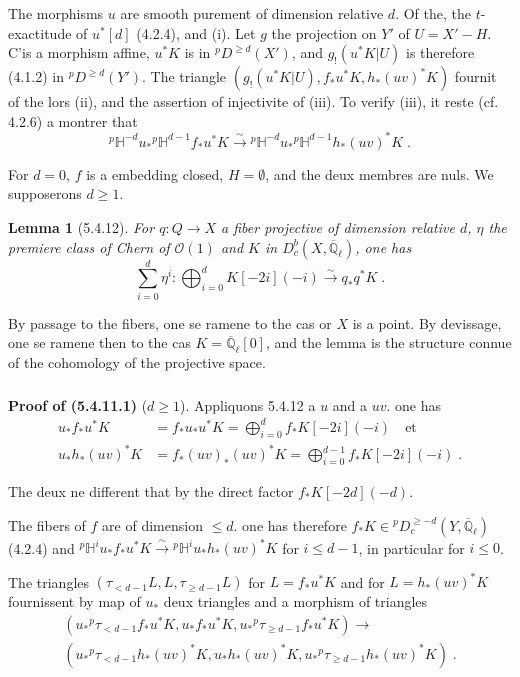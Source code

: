 \documentclass[12pt,a4paper]{article}
\theoremstyle{plain}
\newtheorem{lemma}[theorem]{Lemma}
\theoremstyle{definition}
\theoremstyle{remark}
\newcommand{\HH}{\mathbb{H}}
\newcommand{\QQ}{\mathbb{Q}}
\newcommand{\cO}{\mathcal{O}}
\begin{document}
The morphisms $u$ are smooth purement of dimension relative $d$. Of the, the $t$-exactitude of $u^*[d]$ (4.2.4), and (i). Let $g$ the projection on $Y'$ of $U = X' - H$. C'is a morphism affine, $u^*K$ is in ${}^{p}D^{\geq d}(X')$, and $g_!(u^*K|U)$ is therefore (4.1.2) in ${}^{p}D^{\geq d}(Y')$. The triangle $(g_!(u^*K|U), f_*u^*K, h_*(uv)^*K)$ fournit of the lors (ii), and the assertion of injectivite of (iii). To verify (iii), it reste (cf. 4.2.6) a montrer that
\begin{equation}\label{eq:5.4.11.1}
{}^{p}\HH^{-d}u_*{}^{p}\HH^{d-1}f_*u^*K \xrightarrow{\sim} {}^{p}\HH^{-d}u_*{}^{p}\HH^{d-1}h_*(uv)^*K\;.
\end{equation}

For $d = 0$, $f$ is a embedding closed, $H = \emptyset$, and the deux membres are nuls. We supposerons $d \geq 1$.

\begin{lemma}[5.4.12]
For $q: Q \to X$ a fiber projective of dimension relative $d$, $\eta$ the premiere class of Chern of $\cO(1)$ and $K$ in $D^b_c(X, \overline{\QQ}_{\ell})$, one has
\[
\sum_{i=0}^{d} \eta^i: \bigoplus_{i=0}^{d} K[-2i](-i) \xrightarrow{\sim} q_*q^*K\;.
\]
\end{lemma}

By passage to the fibers, one se ramene to the cas or $X$ is a point. By devissage, one se ramene then to the cas $K = \overline{\QQ}_{\ell}[0]$, and the lemma is the structure connue of the cohomology of the projective space.

\subsubsection{}
\textbf{Proof of (5.4.11.1)} ($d \geq 1$). Appliquons 5.4.12 a $u$ and a $uv$. one has
\begin{align*}
u_*f_*u^*K &= f_*u_*u^*K = \bigoplus_{i=0}^{d} f_*K[-2i](-i) \quad \text{et} \\
u_*h_*(uv)^*K &= f_*(uv)_*(uv)^*K = \bigoplus_{i=0}^{d-1} f_*K[-2i](-i)\;.
\end{align*}

The deux ne different that by the direct factor $f_*K[-2d](-d)$.

The fibers of $f$ are of dimension $\leq d$. one has therefore $f_*K \in {}^{p}D^{\geq -d}_c(Y, \overline{\QQ}_{\ell})$ (4.2.4) and ${}^{p}\HH^iu_*f_*u^*K \xrightarrow{\sim} {}^{p}\HH^iu_*h_*(uv)^*K$ for $i \leq d-1$, in particular for $i \leq 0$.

The triangles $(\tau_{<d-1}L, L, \tau_{\geq d-1}L)$ for $L = f_*u^*K$ and for $L = h_*(uv)^*K$ fournissent by map of $u_*$ deux triangles and a morphism of triangles
\begin{multline*}
(u_*{}^{p}\tau_{<d-1}f_*u^*K, u_*f_*u^*K, u_*{}^{p}\tau_{\geq d-1}f_*u^*K) \longrightarrow \\
(u_*{}^{p}\tau_{<d-1}h_*(uv)^*K, u_*h_*(uv)^*K, u_*{}^{p}\tau_{\geq d-1}h_*(uv)^*K)\;.
\end{multline*}
\end{document}
